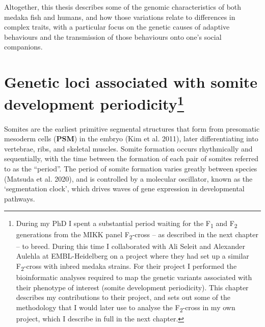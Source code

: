 \documentclass[
]{book}
\begin{document}
Altogether, this thesis describes some of the genomic characteristics of both medaka fish and humans, and how those variations relate to differences in complex traits, with a particular focus on the genetic causes of adaptive behaviours and the transmission of those behaviours onto one's social companions.

\hypertarget{Somite-chap}{%
\chapter[Genetic loci associated with somite development periodicity]{\texorpdfstring{Genetic loci associated with somite development periodicity\footnote{During my PhD I spent a substantial period waiting for the F\textsubscript{1} and F\textsubscript{2} generations from the MIKK panel F\textsubscript{2}-cross -- as described in the next chapter -- to breed. During this time I collaborated with Ali Seleit and Alexander Aulehla at EMBL-Heidelberg on a project where they had set up a similar F\textsubscript{2}-cross with inbred medaka strains. For their project I performed the bioinformatic analyses required to map the genetic variants associated with their phenotype of interest (somite development periodicity). This chapter describes my contributions to their project, and sets out some of the methodology that I would later use to analyse the F\textsubscript{2}-cross in my own project, which I describe in full in the next chapter.}}{Genetic loci associated with somite development periodicity}}\label{Somite-chap}}


Somites are the earliest primitive segmental structures that form from presomatic mesoderm cells (\textbf{PSM}) in the embryo (Kim et al. 2011), later differentiating into vertebrae, ribs, and skeletal muscles. Somite formation occurs rhythmically and sequentially, with the time between the formation of each pair of somites referred to as the ``period''. The period of somite formation varies greatly between species (Matsuda et al. 2020), and is controlled by a molecular oscillator, known as the `segmentation clock', which drives waves of gene expression in developmental pathways.
\end{document}
